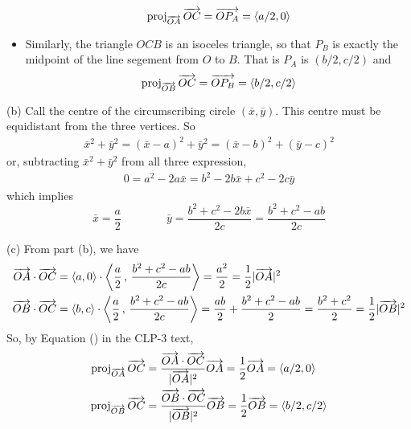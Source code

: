 \begin{solution}
\begin{itemize}
\begin{equation*}
\text{proj}_{\overrightarrow{\scriptstyle OA}}\,\overrightarrow{OC}
    =\overrightarrow{OP_A}=\left< a/2,0\right>
\end{equation*}
\item 
Similarly, the triangle $OCB$ is an isoceles triangle, so that $P_B$ is 
exactly the midpoint of the line segement from $O$ to $B$. That is $P_A$ is $(b/2,c/2)$ and
\begin{equation*}
\text{proj}_{\overrightarrow{\scriptstyle OB}}\,\overrightarrow{OC}
    =\overrightarrow{OP_B}=\left< b/2,c/2\right>
\end{equation*}
\end{itemize}

(b)
Call the centre of the circumscribing circle $(\bar x,\bar y)$. 
This centre must be equidistant from the three vertices.
So
\begin{align*}
\bar x^2+\bar y^2=(\bar x-a)^2+\bar y^2=(\bar x-b)^2+(\bar y-c)^2 
\end{align*}
or, subtracting $\bar x^2+\bar y^2$ from all three expression,
\begin{align*}
0=a^2-2a\bar x=b^2-2b\bar x+c^2-2c\bar y
\end{align*}
which implies
\begin{equation*}
\bar x=\frac{a}{2}\qquad\qquad \bar y
=\frac{b^2+c^2-2b\bar x}{2c}=\frac{b^2+c^2-ab}{2c}
\end{equation*}


(c) From part (b), we have
\begin{align*}
\overrightarrow{OA}\cdot\overrightarrow{OC}
&=\left< a,0\right>\cdot\left<\frac{a}{2}\,,\,\frac{b^2+c^2-ab}{2c}\right>
=\frac{a^2}{2}=\frac{1}{2}|\overrightarrow{OA}|^2\\
\overrightarrow{OB}\cdot\overrightarrow{OC}
&=\left< b,c\right>\cdot\left<\frac{a}{2}\,,\,\frac{b^2+c^2-ab}{2c}\right>
=\frac{ab}{2}+\frac{b^2+c^2-ab}{2}=\frac{b^2+c^2}{2}
=\frac{1}{2}|\overrightarrow{OB}|^2 
\end{align*}
So, by Equation () in the CLP-3 text,
\begin{align*}
\text{proj}_{\overrightarrow{\scriptstyle OA}}\,\overrightarrow{OC}
&=\frac{\overrightarrow{OA}\cdot\overrightarrow{OC}}{|\overrightarrow{OA}|^2}
           \overrightarrow{OA}
=\frac{1}{2}\overrightarrow{OA}
=\left< a/2,0\right> \\
\text{proj}_{\overrightarrow{\scriptstyle OB}}\,\overrightarrow{OC}
&=\frac{\overrightarrow{OB}\cdot\overrightarrow{OC}}{|\overrightarrow{OB}|^2}
           \overrightarrow{OB}
=\frac{1}{2}\overrightarrow{OB}
=\left< b/2,c/2\right>
\end{align*}


\end{solution}







